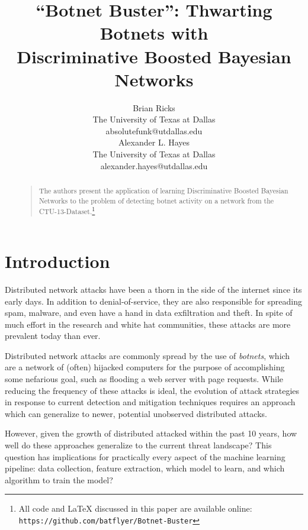 \documentclass[letterpaper]{article}
\begin{document}
%
\title{``Botnet Buster'': Thwarting Botnets with\\Discriminative Boosted Bayesian Networks}

\author{Brian Ricks\\
The University of Texas at Dallas\\
absolutefunk@utdallas.edu\\
\And
Alexander L. Hayes\\
The University of Texas at Dallas\\
alexander.hayes@utdallas.edu
}

\maketitle
\begin{abstract}
\begin{quote}
The authors present the application of learning Discriminative Boosted Bayesian Networks to the problem of detecting botnet activity on a network from the CTU-13-Dataset.\footnote{All code and \LaTeX{} discussed in this paper are available online:  \texttt{https://github.com/batflyer/Botnet-Buster}}
\end{quote}
\end{abstract}

\section{Introduction}
Distributed network attacks have been a thorn in the side of the internet since its early days.  In addition to denial-of-service, they are also responsible for spreading spam, malware, and even have a hand in data exfiltration and theft.  In spite of much effort in the research and white hat communities, these attacks are more prevalent today than ever.

Distributed network attacks are commonly spread by the use of \emph{botnets}, which are a network of (often) hijacked computers for the purpose of accomplishing some nefarious goal, such as flooding a web server with page requests.  While reducing the frequency of these attacks is ideal, the evolution of attack strategies in response to current detection and mitigation techniques requires an approach which can generalize to newer, potential unobserved distributed attacks.

However, given the growth of distributed attacked within the past 10 years, how well do these approaches generalize to the current threat landscape?  This question has implications for practically every aspect of the machine learning pipeline: data collection, feature extraction, which model to learn, and which algorithm to train the model?
\end{document}
